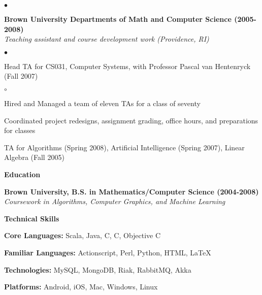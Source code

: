 \documentclass[ComputerScience]{vita}
\newcommand{\CPP}
{C\nolinebreak[4]\hspace{-.05em}\raisebox{.60ex}{\tiny\bf ++}}
\newenvironment{suber}[0]
{\begin{list}{$\bullet$}
	{\setlength{\topsep}{-0.4in}
		\setlength{\leftmargin}{0.25in}
		\setlength{\itemsep}{0.01in}}
}
{\end{list}\par}
\newenvironment{suberb}[0]
{\begin{list}{$\circ$}
	{\setlength{\topsep}{-0.4in}
		\setlength{\leftmargin}{0.25in}
		\setlength{\itemsep}{0.01in}}
}
{\end{list}\par}
\begin{document}
\begin{vita}
\begin{list}{}{\setlength{\leftmargin}{.25in}}
\begin{suber}
    \end{suber}
    \item {\bf Brown University Departments of Math and Computer Science (2005-2008)}\\
    {\em Teaching assistant and course development work (Providence, RI)}
    \begin{suber}
	\item Head TA for CS031, Computer Systems, with Professor Pascal van Hentenryck (Fall 2007)
        \begin{suberb}
        	\item Hired and Managed a team of eleven TAs for a class of seventy
					\item Coordinated project redesigns, assignment grading, office hours, and preparations for classes
        \end{suberb}
	\item TA for Algorithms (Spring 2008), Artificial Intelligence (Spring 2007), Linear Algebra (Fall 2005)
    \end{suber}
\end{list}
{\bf {\large Education}}\ \hrulefill
\begin{list}{}{\setlength{\leftmargin}{.25in}}
\item {\bf Brown University,
	B.S. in Mathematics/Computer Science (2004-2008)}\\
	{\em Coursework in Algorithms, Computer Graphics, and Machine Learning }
\end{list}
{\bf{\large Technical Skills}}\ \hrulefill
\begin{list}{}{\setlength{\leftmargin}{.25in}}
	\item {\bf Core Languages:} Scala, Java, C, \CPP, Objective C
	\item {\bf Familiar Languages:} Actionscript, Perl, Python, HTML, \LaTeX{}
	\item {\bf Technologies:} MySQL, MongoDB, Riak, RabbitMQ, Akka
	\item {\bf Platforms:} Android, iOS, Mac, Windows, Linux
\end{list}
\end{vita}
\end{document}
